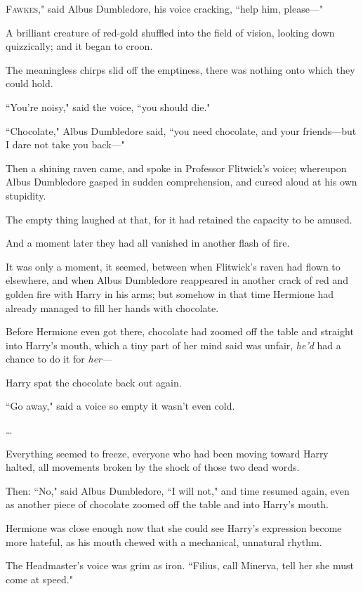 
\lettrine[ante=``]{F}{awkes}," said Albus Dumbledore, his voice cracking, ``help him, please—"

A brilliant creature of red-gold shuffled into the field of vision, looking down quizzically; and it began to croon.

The meaningless chirps slid off the emptiness, there was nothing onto which they could hold.

``You're noisy," said the voice, ``you should die."

``Chocolate," Albus Dumbledore said, ``you need chocolate, and your friends—but I dare not take you back—"

Then a shining raven came, and spoke in Professor Flitwick's voice; whereupon Albus Dumbledore gasped in sudden comprehension, and cursed aloud at his own stupidity.

The empty thing laughed at that, for it had retained the capacity to be amused.

And a moment later they had all vanished in another flash of fire.

\later

It was only a moment, it seemed, between when Flitwick's raven had flown to elsewhere, and when Albus Dumbledore reappeared in another crack of red and golden fire with Harry in his arms; but somehow in that time Hermione had already managed to fill her hands with chocolate.

Before Hermione even got there, chocolate had zoomed off the table and straight into Harry's mouth, which a tiny part of her mind said was unfair, \emph{he'd} had a chance to do it for \emph{her—}

Harry spat the chocolate back out again.

``Go away," said a voice so empty it wasn't even cold.

{\ldots}

Everything seemed to freeze, everyone who had been moving toward Harry halted, all movements broken by the shock of those two dead words.

Then: ``No," said Albus Dumbledore, ``I will not," and time resumed again, even as another piece of chocolate zoomed off the table and into Harry's mouth.

Hermione was close enough now that she could see Harry's expression become more hateful, as his mouth chewed with a mechanical, unnatural rhythm.

The Headmaster's voice was grim as iron. ``Filius, call Minerva, tell her she must come at speed."

